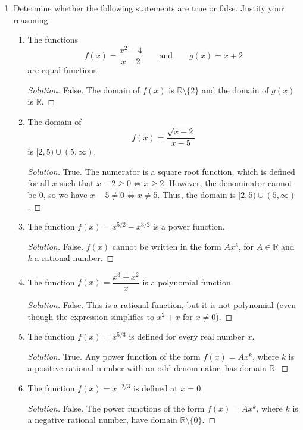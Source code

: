 \documentclass[12pt]{article}
\newenvironment{solution}{\begin{proof}[Solution]}{\end{proof}}
\begin{document}
\begin{enumerate}
\begin{enumerate}
		\end{enumerate}
		
		\item Determine whether the following statements are true or false. Justify your reasoning.
		\begin{enumerate}
				\item The functions
				$$
				f(x)=\frac{x^2-4}{x-2}
				\qquad\text{and}\qquad
				g(x)=x+2
				$$
				are equal functions.
				\begin{solution}
					False. The domain of $f(x)$ is $\mathbb{R}\setminus\{2\}$ and the domain of $g(x)$ is $\mathbb{R}$.
				\end{solution}
				
				\item The domain of
				$$
				f(x)=\frac{\sqrt{x-2}}{x-5}
				$$
				is $[2,5)\cup(5,\infty)$.
				\begin{solution}
					True. The numerator is a square root function, which is defined for all $x$ such that $x-2\geq0\iff x\geq 2$. However, the denominator cannot be 0, so we have $x-5\neq0 \iff x\neq 5$. Thus, the domain is $[2,5)\cup(5,\infty)$.
				\end{solution}
				\item The function $f(x)=x^{5/2}-x^{3/2}$ is a power function.
				\begin{solution}
					False. $f(x)$ cannot be written in the form $Ax^k$, for $A\in\mathbb{R}$ and $k$ a rational number.
				\end{solution}
				\item The function $f(x)=\dfrac{x^3+x^2}{x}$ is a polynomial function.
				\begin{solution}
					False. This is a rational function, but it is not polynomial (even though the expression simplifies to $x^2+x$ for $x\neq0$).
				\end{solution}
				\item The function $f(x)=x^{5/3}$ is defined for every real number $x$.
				\begin{solution}
					True. Any power function of the form $f(x)=Ax^k$, where $k$ is a positive rational number with an odd denominator, has domain $\mathbb{R}$.
				\end{solution}
				
				\setcounter{enumi}{3}
				\item The function $f(x)=x^{-2/3}$ is defined at $x=0$.
				\begin{solution}
					False. The power functions of the form $f(x)=Ax^k$, where $k$ is a negative rational number, have domain $\mathbb{R}\setminus\{0\}$.
				\end{solution}
				

\end{enumerate}
\end{enumerate}
\end{document}
